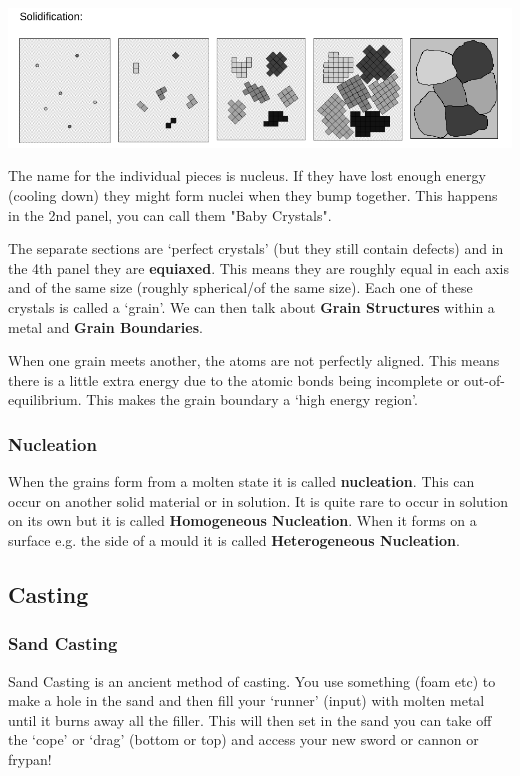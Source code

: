 \documentclass[12pt]{article}
\begin{document}
\includegraphics[scale=0.4]{solidification}

The name for the individual pieces is nucleus.
If they have lost enough energy (cooling down) they might form nuclei when they bump together.
This happens in the 2nd panel, you can call them "Baby Crystals".

The separate sections are `perfect crystals' (but they still contain defects) and in the 4th panel they are \textbf{equiaxed}. 
This means they are roughly equal in each axis and of the same size (roughly spherical/of the same size).
Each one of these crystals is called a `grain'.  
We can then talk about \textbf{Grain Structures} within a metal and \textbf{Grain Boundaries}.

When one grain meets another, the atoms are not perfectly aligned. 
This means there is a little extra energy due to the atomic bonds being incomplete or out-of-equilibrium.
This makes the grain boundary a `high energy region'.

\subsubsection{Nucleation}
When the grains form from a molten state it is called \textbf{nucleation}. 
This can occur on another solid material or in solution. 
It is quite rare to occur in solution on its own but it is called \textbf{Homogeneous Nucleation}.
When it forms on a surface e.g. the side of a mould it is called \textbf{Heterogeneous Nucleation}.

\subsection{Casting}
\subsubsection{Sand Casting}
Sand Casting is an ancient method of casting. 
You use something (foam etc) to make a hole in the sand and then fill your `runner' (input) with molten metal until it burns away all the filler.
This will then set in the sand you can take off the `cope' or `drag' (bottom or top) and access your new sword or cannon or frypan!
\end{document}
